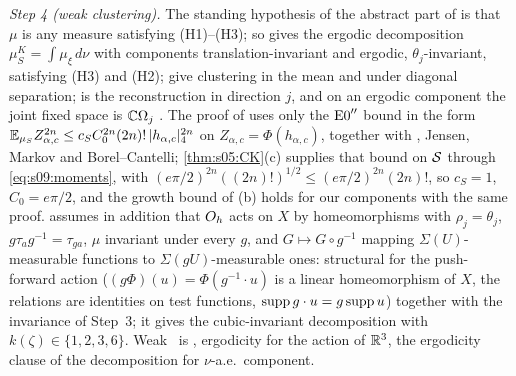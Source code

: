 \emph{Step 4 (weak clustering).} The standing hypothesis of the abstract part of \cite{SymPhase} is that $\mu$ is any measure satisfying (H1)--(H3); so \cite[Thm.~10.10]{SymPhase} gives the ergodic decomposition $\mu^K_S=\int\mu_\xi\,d\nu$ with components translation-invariant and ergodic, $\theta_j$-invariant, satisfying (H3) and (H2); \cite[Thm.~10.19, Thm.~10.20]{SymPhase} give clustering in the mean and under diagonal separation; \cite[Prop.~10.16]{SymPhase} is the reconstruction in direction $j$, and on an ergodic component the joint fixed space is $\mathbb C\Omega_j$ \cite[Prop.~10.17(iii)]{SymPhase}. The proof of \cite[Cor.~10.43(iv)]{SymPhase} uses only the $\mathrm{E0}''$ bound in the form $\mathbb E_{\mu_S}Z_{\alpha,c}^{2n}\le c_SC_0^{2n}(2n)!\,\lvert h_{\alpha,c}\rvert_{4}^{2n}$ on $Z_{\alpha,c}=\Phi(h_{\alpha,c})$, together with \cite[Lemma~10.5(a)]{SymPhase}, Jensen, Markov and Borel--Cantelli; \cref{thm:s05:CK}(c) supplies that bound on $\mathcal S$ through \eqref{eq:s09:moments}, with $(e\pi/2)^{2n}((2n)!)^{1/2}\le(e\pi/2)^{2n}(2n)!$, so $c_S=1$, $C_0=e\pi/2$, and the growth bound of (b) holds for our components with the same proof. \cite[Thm.~10.12]{SymPhase} assumes in addition that $O_h$ acts on $X$ by homeomorphisms with $\rho_j=\theta_j$, $g\tau_ag^{-1}=\tau_{ga}$, $\mu$ invariant under every $g$, and $G\mapsto G\circ g^{-1}$ mapping $\Sigma(U)$-measurable functions to $\Sigma(gU)$-measurable ones: structural for the push-forward action ($(g\Phi)(u)=\Phi(g^{-1}\cdot u)$ is a linear homeomorphism of $X$, the relations are identities on test functions, $\operatorname{supp} g\cdot u=g\operatorname{supp} u$) together with the invariance of Step~3; it gives the cubic-invariant decomposition with $k(\zeta)\in\{1,2,3,6\}$. Weak \OSf\ is \cite[Def.~2.12(iii)]{SymPhase}, ergodicity for the action of $\mathbb R^3$, the ergodicity clause of the decomposition for $\nu$-a.e.\ component.

